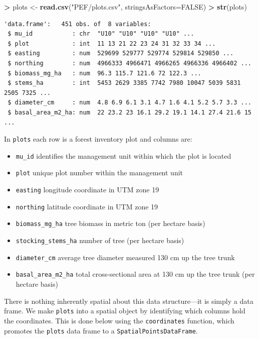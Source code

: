 \documentclass[
]{krantz}
\makeatletter
\newenvironment{Shaded}{\begin{snugshade}}{\end{snugshade}}
\newcommand{\DataTypeTok}[1]{\textcolor[rgb]{0.27,0.27,0.27}{#1}}
\newcommand{\KeywordTok}[1]{\textcolor[rgb]{0.27,0.27,0.27}{\textbf{#1}}}
\newcommand{\NormalTok}[1]{#1}
\newcommand{\OperatorTok}[1]{\textcolor[rgb]{0.43,0.43,0.43}{\textbf{#1}}}
\newcommand{\OtherTok}[1]{\textcolor[rgb]{0.37,0.37,0.37}{#1}}
\newcommand{\StringTok}[1]{\textcolor[rgb]{0.5,0.5,0.5}{#1}}
\providecommand{\tightlist}{%
  \setlength{\itemsep}{0pt}\setlength{\parskip}{0pt}}
\newenvironment{kframe}{%
\medskip{}
\setlength{\fboxsep}{.8em}
 \def\at@end@of@kframe{}%
 \ifinner\ifhmode%
  \def\at@end@of@kframe{\end{minipage}}%
  \begin{minipage}{\columnwidth}%
 \fi\fi%
 \def\FrameCommand##1{\hskip\@totalleftmargin \hskip-\fboxsep
 \colorbox{shadecolor}{##1}\hskip-\fboxsep
     \hskip-\linewidth \hskip-\@totalleftmargin \hskip\columnwidth}%
 \MakeFramed {\advance\hsize-\width
   \@totalleftmargin\z@ \linewidth\hsize
   \@setminipage}}%
 {\par\unskip\endMakeFramed%
 \at@end@of@kframe}
\renewenvironment{Shaded}{\begin{kframe}}{\end{kframe}}
\makeatother
\begin{document}
\begin{Shaded}
\begin{Highlighting}[]
\OperatorTok{\textgreater{}}\StringTok{ }\NormalTok{plots \textless{}{-}}\StringTok{ }\KeywordTok{read.csv}\NormalTok{(}\StringTok{"PEF/plots.csv"}\NormalTok{, }\DataTypeTok{stringsAsFactors=}\OtherTok{FALSE}\NormalTok{)}
\OperatorTok{\textgreater{}}\StringTok{ }\KeywordTok{str}\NormalTok{(plots)}
\end{Highlighting}
\end{Shaded}

\begin{verbatim}
'data.frame':   451 obs. of  8 variables:
 $ mu_id           : chr  "U10" "U10" "U10" "U10" ...
 $ plot            : int  11 13 21 22 23 24 31 32 33 34 ...
 $ easting         : num  529699 529777 529774 529814 529850 ...
 $ northing        : num  4966333 4966471 4966265 4966336 4966402 ...
 $ biomass_mg_ha   : num  96.3 115.7 121.6 72 122.3 ...
 $ stems_ha        : int  5453 2629 3385 7742 7980 10047 5039 5831 2505 7325 ...
 $ diameter_cm     : num  4.8 6.9 6.1 3.1 4.7 1.6 4.1 5.2 5.7 3.3 ...
 $ basal_area_m2_ha: num  22 23.2 23 16.1 29.2 19.1 14.1 27.4 21.6 15 ...
\end{verbatim}

In \texttt{plots} each row is a forest inventory plot and columns are:

\begin{itemize}
\tightlist
\item
  \texttt{mu\_id} identifies the management unit within which the plot is located
\item
  \texttt{plot} unique plot number within the management unit
\item
  \texttt{easting} longitude coordinate in UTM zone 19
\item
  \texttt{northing} latitude coordinate in UTM zone 19
\item
  \texttt{biomass\_mg\_ha} tree biomass in metric ton (per hectare basis)
\item
  \texttt{stocking\_stems\_ha} number of tree (per hectare basis)
\item
  \texttt{diameter\_cm} average tree diameter measured 130 cm up the tree trunk
\item
  \texttt{basal\_area\_m2\_ha} total cross-sectional area at 130 cm up the tree trunk (per hectare basis)
\end{itemize}

There is nothing inherently spatial about this data structure---it is simply a data frame. We make \texttt{plots} into a spatial object by identifying which columns hold the coordinates. This is done below using the \texttt{coordinates} function, which promotes the \texttt{plots} data frame to a \texttt{SpatialPointsDataFrame}.
\end{document}
